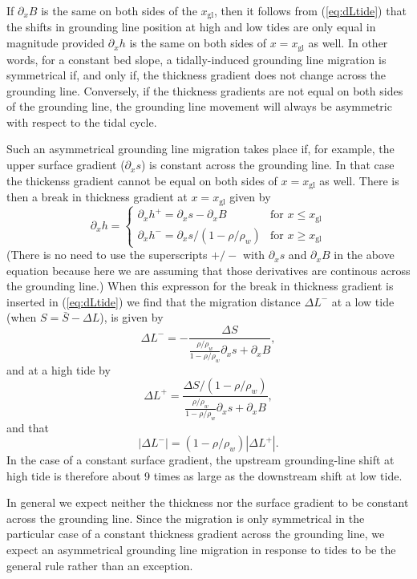 \documentclass[10pt,a4paper]{book}
\newcommand{\p}{\partial}
\newcommand{\xgl}{x_{\mathrm{gl}}}
\begin{document}
If $\p_x B$ is the same on both sides of the $\xgl$, then it follows
from (\ref{eq:dLtide}) that the shifts in grounding line position at
high and low tides are only equal in magnitude provided $\p_x h$ is
the same on both sides of $x=\xgl$ as well. In other words, for a
constant bed slope, a tidally-induced grounding line migration is
symmetrical if, and only if, the thickness gradient does not change
across the grounding line. Conversely, if the thickness
gradients are not equal on both sides of the grounding line, the
grounding line movement will always be asymmetric with respect to the tidal
cycle.

Such an asymmetrical grounding line migration takes place if,
for example, the upper surface gradient ($\p_x s$) is constant across
the grounding line. In that case the thickenss gradient cannot be
equal on both sides of $x=\xgl$ as well.  There is then a break in
thickness gradient at $x=\xgl$ given by
\[
\p_x h= \begin{cases} \p_x h^{+}=\p_x s - \p_x B & \text{for } x \leq \xgl \\
                      \p_x h^{-}=\p_x s/(1-\rho/\rho_w) & \text{for } x \geq \xgl
        \end{cases} 
\]
(There is no need to use the superscripts $+/-$ with $\p_x s$ and
$\p_x B$ in the above equation because here we are assuming that those
derivatives are continous across the grounding line.)  When this
expresson for the break in thickness gradient is inserted in
(\ref{eq:dLtide}) we find that the migration distance $\Delta L^{-}$
at a low tide (when $S=\bar{S}-\Delta L$), is given by
\[
\Delta L^{-} = - \frac{\Delta S}{\frac{\rho/\rho_w}{1-\rho/\rho_w} \p_x s + \p_x B} ,
\]
and at a high tide by
\[
\Delta L^{+} = \frac{\Delta S/(1-\rho/\rho_w) }{\frac{\rho/\rho_w}{1-\rho/\rho_w} \p_x s + \p_x B} ,
\]
and that
\[
|\Delta L^{-}| = (1-\rho/\rho_w) | \Delta L^{+}| .
\] 
In the case of a constant surface gradient, the upstream
grounding-line shift at high tide is therefore about 9 times as large
as the downstream shift at low tide.



In general we expect neither the thickness nor the surface gradient to
be constant across the grounding line. Since the migration is only
symmetrical in the particular case of a constant thickness gradient
across the grounding line, we expect an asymmetrical grounding line
migration in response to tides to be the general rule rather than an exception.
\end{document}
